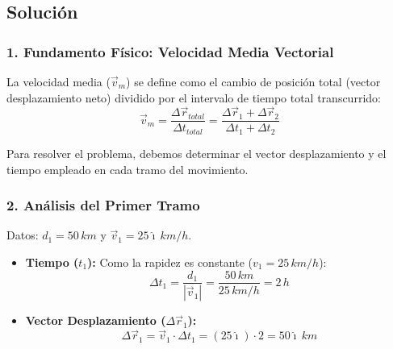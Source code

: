 \documentclass[12pt, a4paper]{article}
\begin{document}
\begin{center}
\end{center}

\subsection*{Solución}

\subsubsection*{1. Fundamento Físico: Velocidad Media Vectorial}

La velocidad media ($\vec{v}_m$) se define como el cambio de posición total (vector desplazamiento neto) dividido por el intervalo de tiempo total transcurrido:
\begin{equation}
    \vec{v}_m = \frac{\Delta \vec{r}_{total}}{\Delta t_{total}} = \frac{\Delta \vec{r}_1 + \Delta \vec{r}_2}{\Delta t_1 + \Delta t_2}
\end{equation}

Para resolver el problema, debemos determinar el vector desplazamiento y el tiempo empleado en cada tramo del movimiento.

\subsubsection*{2. Análisis del Primer Tramo}

Datos: $d_1 = 50 \, \si{km}$ y $\vec{v}_1 = 25 \hat{\imath} \, \si{km/h}$.
\begin{itemize}
    \item \textbf{Tiempo ($t_1$):} Como la rapidez es constante ($v_1 = 25 \, \si{km/h}$):
    \begin{equation}
        \Delta t_1 = \frac{d_1}{|\vec{v}_1|} = \frac{50 \, \si{km}}{25 \, \si{km/h}} = 2 \, \si{h}
    \end{equation}
    \item \textbf{Vector Desplazamiento ($\Delta \vec{r}_1$):}
    \begin{equation}
        \Delta \vec{r}_1 = \vec{v}_1 \cdot \Delta t_1 = (25 \hat{\imath}) \cdot 2 = 50 \hat{\imath} \, \si{km}
    \end{equation}
\end{itemize}
\end{document}
